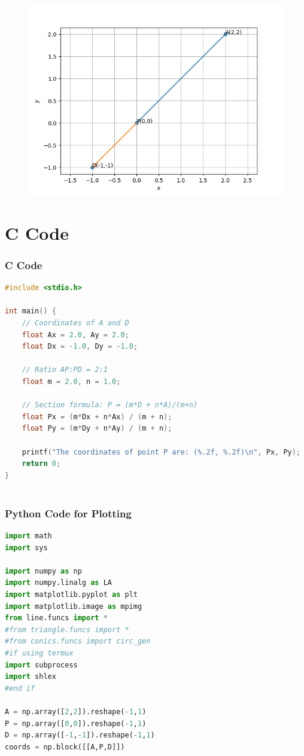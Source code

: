 \documentclass{beamer}
\theoremstyle{remark}
\numberwithin{equation}{section}
\begin{document}
    
       \begin{frame}[fragile]
    \begin{figure}[H]
    \centering
    \includegraphics[width = 0.6\columnwidth]{../figs/img.png}
    \caption*{}
    \label{figs}
\end{figure}
\end{frame}
\section{ C Code}
\begin{frame}[fragile]
\frametitle{C Code }
\begin{lstlisting}[language=C]
#include <stdio.h>

int main() {
    // Coordinates of A and D
    float Ax = 2.0, Ay = 2.0;
    float Dx = -1.0, Dy = -1.0;

    // Ratio AP:PD = 2:1
    float m = 2.0, n = 1.0;

    // Section formula: P = (m*D + n*A)/(m+n)
    float Px = (m*Dx + n*Ax) / (m + n);
    float Py = (m*Dy + n*Ay) / (m + n);

    printf("The coordinates of point P are: (%.2f, %.2f)\n", Px, Py);
    return 0;
}
    
\end{lstlisting}
\end{frame}



\begin{frame}[fragile]
\frametitle{Python Code for Plotting}
\begin{lstlisting}[language=Python]
import math
import sys   

import numpy as np
import numpy.linalg as LA
import matplotlib.pyplot as plt
import matplotlib.image as mpimg
from line.funcs import *
#from triangle.funcs import *
#from conics.funcs import circ_gen
#if using termux
import subprocess
import shlex
#end if

A = np.array([2,2]).reshape(-1,1)
P = np.array([0,0]).reshape(-1,1)
D = np.array([-1,-1]).reshape(-1,1)
coords = np.block([[A,P,D]])

\end{lstlisting}

\end{frame}
\end{document}
